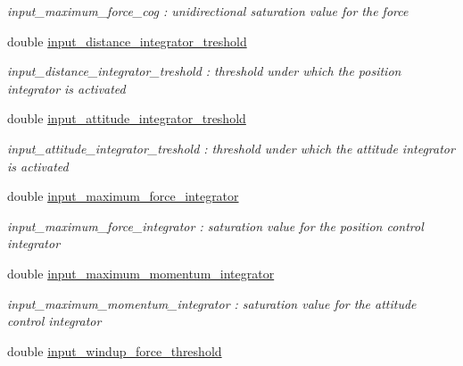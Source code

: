 \begin{DoxyCompactItemize}
\begin{DoxyCompactList}\small\item\em input\-\_\-maximum\-\_\-force\-\_\-cog \-: unidirectional saturation value for the force \end{DoxyCompactList}\item 
\hypertarget{struct_skye_parameters_a00f578515588e5d0ab40cc52febe08bf}{double \hyperlink{struct_skye_parameters_a00f578515588e5d0ab40cc52febe08bf}{input\-\_\-distance\-\_\-integrator\-\_\-treshold}}\label{struct_skye_parameters_a00f578515588e5d0ab40cc52febe08bf}

\begin{DoxyCompactList}\small\item\em input\-\_\-distance\-\_\-integrator\-\_\-treshold \-: threshold under which the position integrator is activated \end{DoxyCompactList}\item 
\hypertarget{struct_skye_parameters_af4cc7d48375ee12e4f0e1863e0f11b28}{double \hyperlink{struct_skye_parameters_af4cc7d48375ee12e4f0e1863e0f11b28}{input\-\_\-attitude\-\_\-integrator\-\_\-treshold}}\label{struct_skye_parameters_af4cc7d48375ee12e4f0e1863e0f11b28}

\begin{DoxyCompactList}\small\item\em input\-\_\-attitude\-\_\-integrator\-\_\-treshold \-: threshold under which the attitude integrator is activated \end{DoxyCompactList}\item 
\hypertarget{struct_skye_parameters_a1bfdd5d7181eaa182e6925545e7b35b5}{double \hyperlink{struct_skye_parameters_a1bfdd5d7181eaa182e6925545e7b35b5}{input\-\_\-maximum\-\_\-force\-\_\-integrator}}\label{struct_skye_parameters_a1bfdd5d7181eaa182e6925545e7b35b5}

\begin{DoxyCompactList}\small\item\em input\-\_\-maximum\-\_\-force\-\_\-integrator \-: saturation value for the position control integrator \end{DoxyCompactList}\item 
\hypertarget{struct_skye_parameters_a5c05c4be8f429eab4ec19e41130a0d39}{double \hyperlink{struct_skye_parameters_a5c05c4be8f429eab4ec19e41130a0d39}{input\-\_\-maximum\-\_\-momentum\-\_\-integrator}}\label{struct_skye_parameters_a5c05c4be8f429eab4ec19e41130a0d39}

\begin{DoxyCompactList}\small\item\em input\-\_\-maximum\-\_\-momentum\-\_\-integrator \-: saturation value for the attitude control integrator \end{DoxyCompactList}\item 
\hypertarget{struct_skye_parameters_ad76ba1c9a3ddebf92412c7b606873ac5}{double \hyperlink{struct_skye_parameters_ad76ba1c9a3ddebf92412c7b606873ac5}{input\-\_\-windup\-\_\-force\-\_\-threshold}}\label{struct_skye_parameters_ad76ba1c9a3ddebf92412c7b606873ac5}


\end{DoxyCompactItemize}

